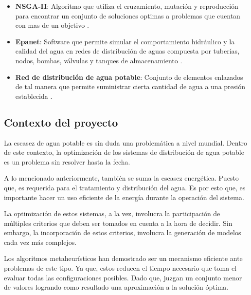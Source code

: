 \documentclass[11pt,letterpaper]{article}
\begin{document}
\begin{itemize}
\item \textbf{NSGA-II}: Algoritmo que utiliza el cruzamiento, mutación y reproducción para encontrar un conjunto de soluciones optimas a problemas que cuentan con mas de un objetivo \cite{Deb2002}. 

\item \textbf{Epanet}: Software que permite simular el comportamiento hidráulico y la calidad del agua en redes de distribución de aguas compuesta por tuberías, nodos, bombas, válvulas y tanques de almacenamiento \cite{Rossman2017}. 
\item \textbf{Red de distribución de agua potable}: Conjunto de elementos enlazados de tal manera que permite suministrar cierta cantidad de agua a una presión establecida \cite{Doctoral2012}.
 
\end{itemize}

\subsection{Contexto del proyecto} 

La escasez de agua potable es sin duda una problemática a nivel mundial. Dentro de este contexto, la optimización de los sistemas de distribución de agua potable es un problema sin resolver hasta la fecha. 

A lo mencionado anteriormente, también se suma la escasez energética. Puesto que, es requerida para el tratamiento y distribución del agua. Es por esto que, es importante hacer un uso eficiente de la energía durante la operación del sistema.

La optimización de estos sistemas, a la vez, involucra la participación de múltiples criterios que deben ser tomados en cuenta a la hora de decidir. Sin embargo, la incorporación de estos criterios, involucra la generación de modelos cada vez más complejos.

Los algoritmos metaheurísticos han demostrado ser un mecanismo eficiente ante problemas de este tipo. Ya que, estos reducen el tiempo necesario que toma el evaluar todas las configuraciones posibles. Dado que, juzgan un conjunto menor de valores logrando como resultado una aproximación a la solución óptima.
\end{document}
